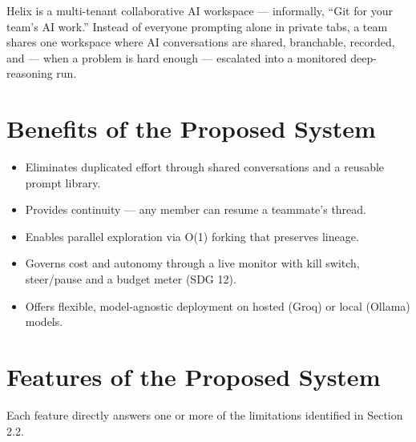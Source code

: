 \documentclass[12pt,a4paper]{report}
\begin{document}
Helix is a multi-tenant collaborative AI workspace --- informally, ``Git for your team's AI work.'' Instead of everyone prompting alone in private tabs, a team shares one workspace where AI conversations are shared, branchable, recorded, and --- when a problem is hard enough --- escalated into a monitored deep-reasoning run.

\section{Benefits of the Proposed System}
\begin{itemize}
  \item Eliminates duplicated effort through shared conversations and a reusable prompt library.
  \item Provides continuity --- any member can resume a teammate's thread.
  \item Enables parallel exploration via O(1) forking that preserves lineage.
  \item Governs cost and autonomy through a live monitor with kill switch, steer/pause and a budget meter (SDG 12).
  \item Offers flexible, model-agnostic deployment on hosted (Groq) or local (Ollama) models.
\end{itemize}

\section{Features of the Proposed System}
Each feature directly answers one or more of the limitations identified in Section 2.2.
\end{document}

